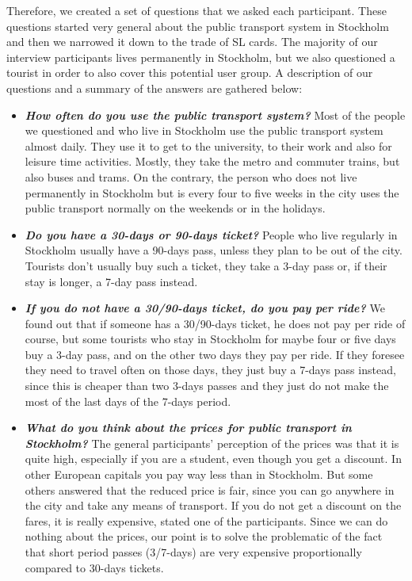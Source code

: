 \documentclass[11pt,twoside,a4paper]{report}
\begin{document}
Therefore, we created a set of questions that we asked each participant. These questions started very general about the public transport system in Stockholm and then we narrowed it down to the trade of SL cards. The majority of our interview participants lives permanently in Stockholm, but we also questioned a tourist in order to also cover this potential user group. A description of our questions and a summary of the answers are gathered below:

\begin{itemize}
\item \textbf{\textit{How often do you use the public transport system?}} Most of the people we questioned and who live in Stockholm use the public transport system almost daily. They use it to get to the university, to their work and also for leisure time activities. Mostly, they take the metro and commuter trains, but also buses and trams. On the contrary, the person who does not live permanently in Stockholm but is every four to five weeks in the city uses the public transport normally on the weekends or in the holidays.
\item \textbf{\textit{Do you have a 30-days or 90-days ticket?}} People who live regularly in Stockholm usually have a 90-days pass, unless they plan to be out of the city. Tourists don't usually buy such a ticket, they take a 3-day pass or, if their stay is longer, a 7-day pass instead.
\item \textbf{\textit{If you do not have a 30/90-days ticket, do you pay per ride?}} We found out that if someone has a 30/90-days ticket, he does not pay per ride of course, but some tourists who stay in Stockholm for maybe four or five days buy a 3-day pass, and on the other two days they pay per ride. If they foresee they need to travel often on those days, they just buy a 7-days pass instead, since this is cheaper than two 3-days passes and they just do not make the most of the last days of the 7-days period.
\item \textbf{\textit{What do you think about the prices for public transport in Stockholm?}} The general participants' perception of the prices was that it is quite high, especially if you are a student, even though you get a discount. In other European capitals you pay way less than in Stockholm. But some others answered that the reduced price is fair, since you can go anywhere in the city and take any means of transport. If you do not get a discount on the fares, it is really expensive, stated one of the participants. Since we can do nothing about the prices, our point is to solve the problematic of the fact that short period passes (3/7-days) are very expensive proportionally compared to 30-days tickets.

\end{itemize}
\end{document}
